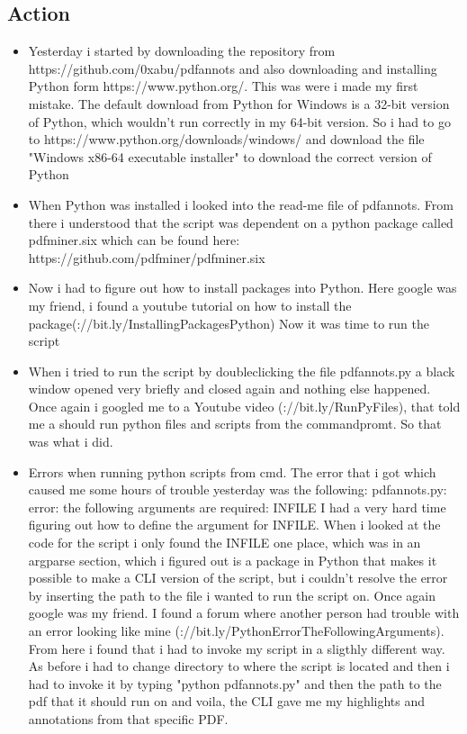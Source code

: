 \documentclass{article}
\begin{document}
\subsection{Action}
\begin{itemize}
    \item Yesterday i started by downloading the repository from https://github.com/0xabu/pdfannots and also downloading and installing Python form https://www.python.org/. This was were i made my first mistake. The default download from Python for Windows is a 32-bit version of Python, which wouldn't run correctly in my 64-bit version. So i had to go to https://www.python.org/downloads/windows/ and download the file  "Windows x86-64 executable installer" to download the correct version of Python
    \item When Python was installed i looked into the read-me file of pdfannots. From there i understood that the script was dependent on a python package called pdfminer.six which can be found here: https://github.com/pdfminer/pdfminer.six
    \item Now i had to figure out how to install packages into Python. Here google was my friend, i found a youtube tutorial on how to install the package(\linkhttps://bit.ly/InstallingPackagesPython) Now it was time to run the script
    \item When i tried to run the script by doubleclicking the file pdfannots.py a black window opened very briefly and closed again and nothing else happened. Once again i googled me to a Youtube video (\linkhttps://bit.ly/RunPyFiles), that told me a should run python files and scripts from the commandpromt. So that was what i did. 
    \item Errors when running python scripts from cmd. The error that i got which caused me some hours of trouble yesterday was the following: pdfannots.py: error: the following arguments are required: INFILE
    I had a very hard time figuring out how to  define the argument for INFILE. When i looked at the code for the script i only found the INFILE one place, which was in an argparse section, which i figured out is a package in Python that makes it possible to make a CLI version of the script, but i couldn't resolve the error by inserting the path to the file i wanted to run the script on. Once again google was my friend. I found a forum where another person had trouble with an error looking like mine (\linkhttp://bit.ly/PythonErrorTheFollowingArguments). From here i found that i had to invoke my script in a sligthly different way. As before i had to change directory to where the script is located and then i had to invoke it by typing "python pdfannots.py" and then the path to the pdf that it should run on and voila, the CLI gave me my highlights and annotations from that specific PDF.
\end{itemize}{}
\end{document}
